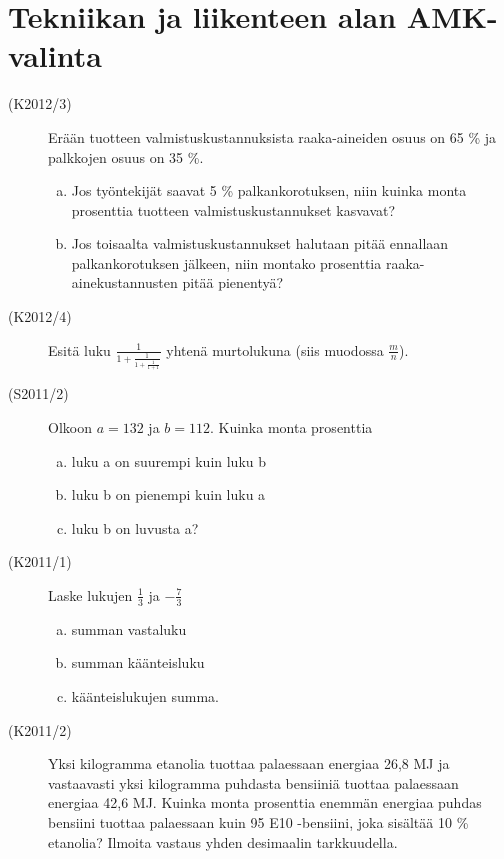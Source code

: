 \section{Tekniikan ja liikenteen alan AMK-valinta}

\begin{description}
	\item[(K2012/3)] Erään tuotteen valmistuskustannuksista raaka-aineiden osuus on
        65 \% ja palkkojen osuus on 35 \%.
        
    	\begin{enumerate}[(a)]
    		\item Jos työntekijät saavat 5 \% palkankorotuksen, niin kuinka monta
                prosenttia tuotteen valmistuskustannukset kasvavat?
    		\item Jos toisaalta valmistuskustannukset halutaan pitää ennallaan
                palkankorotuksen jälkeen, niin montako prosenttia raaka-ainekustannusten
                pitää pienentyä?
    	\end{enumerate}	 

	\item[(K2012/4)] Esitä luku $\frac{1}{1+\frac{1}{1+\frac{1}{1+1}}}$ yhtenä murtolukuna (siis muodossa $\frac{m}{n}$).
	\item[(S2011/2)] Olkoon $a=132$ ja  $b=112$. Kuinka monta prosenttia 
		\begin{enumerate}[(a)]
			\item luku a on suurempi kuin luku b
			\item luku b on pienempi kuin luku a
			\item luku b on luvusta a? 
		\end{enumerate}
	\item[(K2011/1)] Laske lukujen $\frac{1}{3}$ ja $-\frac{7}{3}$
		\begin{enumerate}[(a)]
			\item summan vastaluku
			\item summan käänteisluku 
			\item käänteislukujen summa.
		\end{enumerate}
	\item[(K2011/2)] Yksi kilogramma etanolia tuottaa palaessaan energiaa 26,8 MJ
        ja vastaavasti yksi kilogramma puhdasta bensiiniä tuottaa palaessaan energiaa
        42,6 MJ. Kuinka monta prosenttia enemmän energiaa puhdas bensiini tuottaa
        palaessaan kuin 95 E10 -bensiini, joka sisältää 10 \% etanolia? Ilmoita
        vastaus yhden desimaalin tarkkuudella. 
\end{description}
